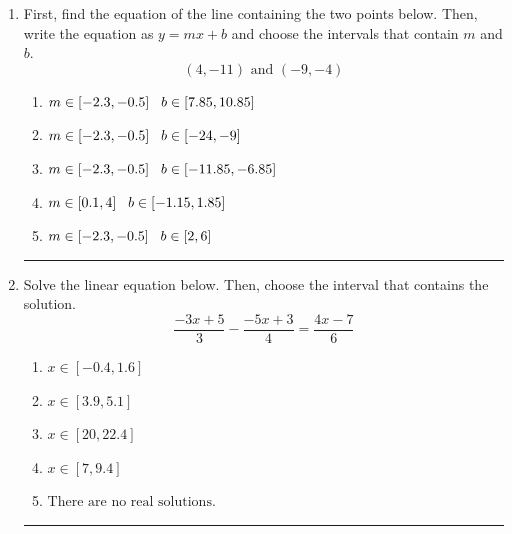 \documentclass[14pt]{extbook}
\newcommand{\litem}[1]{\item#1\hspace*{-1cm}\rule{\textwidth}{0.4pt}}
\begin{document}
\begin{enumerate}
{\begin{enumerate}[label=\Alph*.]
\end{enumerate} }
\litem{
First, find the equation of the line containing the two points below. Then, write the equation as $ y=mx+b $ and choose the intervals that contain $m$ and $b$.\[ (4, -11) \text{ and } (-9, -4) \]\begin{enumerate}[label=\Alph*.]
\item \( m \in [-2.3, -0.5] \hspace*{3mm} b \in [7.85, 10.85] \)
\item \( m \in [-2.3, -0.5] \hspace*{3mm} b \in [-24, -9] \)
\item \( m \in [-2.3, -0.5] \hspace*{3mm} b \in [-11.85, -6.85] \)
\item \( m \in [0.1, 4] \hspace*{3mm} b \in [-1.15, 1.85] \)
\item \( m \in [-2.3, -0.5] \hspace*{3mm} b \in [2, 6] \)

\end{enumerate} }
\litem{
Solve the linear equation below. Then, choose the interval that contains the solution.\[ \frac{-3x + 5}{3} - \frac{-5x + 3}{4} = \frac{4x -7}{6} \]\begin{enumerate}[label=\Alph*.]
\item \( x \in [-0.4, 1.6] \)
\item \( x \in [3.9, 5.1] \)
\item \( x \in [20, 22.4] \)
\item \( x \in [7, 9.4] \)
\item \( \text{There are no real solutions.} \)


\end{enumerate}}
\end{enumerate}
\end{document}
